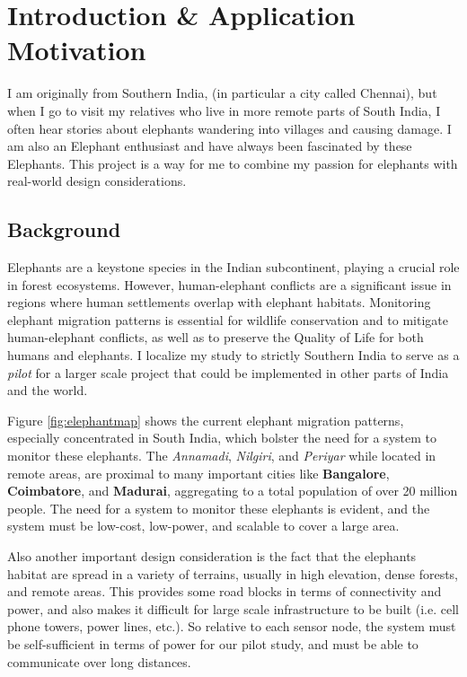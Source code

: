 \section{Introduction \& Application Motivation}
I am originally from Southern India, (in particular a city called Chennai), but when I go to visit my relatives who live in more remote parts of South India, I often hear stories about elephants wandering into villages and causing damage. I am also an Elephant enthusiast and have always been fascinated by these Elephants. This project is a way for me to combine my passion for elephants with real-world design considerations. 

\subsection{Background}
Elephants are a keystone species in the Indian subcontinent, playing a crucial role in forest ecosystems. However, human-elephant conflicts are a significant issue in regions where human settlements overlap with elephant habitats. Monitoring elephant migration patterns is essential for wildlife conservation and to mitigate human-elephant conflicts, as well as to preserve the Quality of Life for both humans and elephants. I localize my study to strictly Southern India to serve as a \textit{pilot} for a larger scale project that could be implemented in other parts of India and the world.

Figure \ref{fig:elephantmap} shows the current elephant migration patterns, especially concentrated in South India, which bolster the need for a system to monitor these elephants. The \textit{Annamadi}, \textit{Nilgiri}, and \textit{Periyar} while located in remote areas, are proximal to many important cities like \textbf{Bangalore}, \textbf{Coimbatore}, and \textbf{Madurai}, aggregating to a total population of over 20 million people\cite{elephantmap}. The need for a system to monitor these elephants is evident, and the system must be low-cost, low-power, and scalable to cover a large area.



Also another important design consideration is the fact that the elephants habitat are spread in a variety of terrains, usually in high elevation, dense forests, and remote areas. This provides some road blocks in terms of connectivity and power, and also makes it difficult for large scale infrastructure to be built (i.e. cell phone towers, power lines, etc.). So relative to each sensor node, the system must be self-sufficient in terms of power for our pilot study, and must be able to communicate over long distances.

